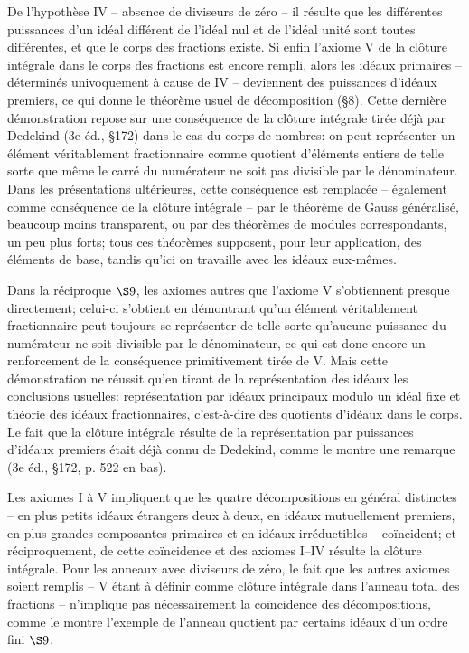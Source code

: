 De l'hypothèse IV -- absence de diviseurs de zéro -- il résulte que les différentes puissances d'un idéal différent de l'idéal nul et de l'idéal unité sont toutes différentes, et que le corps des fractions existe. Si enfin l'axiome V de la clôture intégrale dans le corps des fractions est encore rempli, alors les idéaux primaires -- déterminés univoquement à cause de IV -- deviennent des puissances d'idéaux premiers, ce qui donne le théorème usuel de décomposition (\S{}8). Cette dernière démonstration repose sur une conséquence de la clôture intégrale tirée déjà par Dedekind (3e éd., \S{}172) dans le cas du corps de nombres: on peut représenter un élément véritablement fractionnaire comme quotient d'éléments entiers de telle sorte que même le carré du numérateur ne soit pas divisible par le dénominateur. Dans les présentations ultérieures, cette conséquence est remplacée -- également comme conséquence de la clôture intégrale -- par le théorème de Gauss généralisé, beaucoup moins transparent, ou par des théorèmes de modules correspondants, un peu plus forts; tous ces théorèmes supposent, pour leur application, des éléments de base, tandis qu'ici on travaille avec les idéaux eux-mêmes.

Dans la réciproque \hbox{\(\S 9\)}, les axiomes autres que l'axiome V s'obtiennent presque directement; celui-ci s'obtient en démontrant qu'un élément véritablement fractionnaire peut toujours se représenter de telle sorte qu'aucune puissance du numérateur ne soit divisible par le dénominateur, ce qui est donc encore un renforcement de la conséquence primitivement tirée de V. Mais cette démonstration ne réussit qu'en tirant de la représentation des idéaux les conclusions usuelles: représentation par idéaux principaux modulo un idéal fixe et théorie des idéaux fractionnaires, c'est-à-dire des quotients d'idéaux dans le corps. Le fait que la clôture intégrale résulte de la représentation par puissances d'idéaux premiers était déjà connu de Dedekind, comme le montre une remarque (3e éd., \S{}172, p. 522 en bas).

Les axiomes I à V impliquent que les quatre décompositions en général distinctes -- en plus petits idéaux étrangers deux à deux, en idéaux mutuellement premiers, en plus grandes composantes primaires et en idéaux irréductibles -- coïncident; et réciproquement, de cette coïncidence et des axiomes I--IV résulte la clôture intégrale. Pour les anneaux avec diviseurs de zéro, le fait que les autres axiomes soient remplis -- V étant à définir comme clôture intégrale dans l'anneau total des fractions -- n'implique pas nécessairement la coïncidence des décompositions, comme le montre l'exemple de l'anneau quotient par certains idéaux d'un ordre fini \hbox{\(\S 9\)}.

